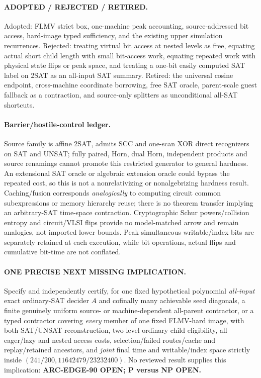 \documentclass[11pt]{article}
\begin{document}
\paragraph{ADOPTED / REJECTED / RETIRED.}
Adopted: FLMV strict box, one-machine peak accounting,
source-addressed bit access, hard-image typed sufficiency,
and the existing upper simulation recurrences.
Rejected: treating virtual bit access at nested levels as free,
equating actual short child length with small bit-access work,
equating repeated work with physical state flips or peak space,
and treating a one-bit easily computed SAT label on 2SAT as
an all-input SAT summary. Retired: the universal cosine endpoint,
cross-machine coordinate borrowing, free SAT oracle, parent-scale
guest fallback as a contraction, and source-only splitters as
unconditional all-SAT shortcuts.

\paragraph{Barrier/hostile-control ledger.}
Source family is affine 2SAT, admits SCC and one-scan XOR direct
recognizers on SAT and UNSAT; fully paired, Horn, dual Horn,
independent products and source renamings cannot promote this
restricted generator to general hardness.
An extensional SAT oracle or algebraic extension oracle could
bypass the repeated cost, so this is not a nonrelativizing
or nonalgebrizing hardness result.
Caching/fusion corresponds \emph{analogically} to computing
circuit common subexpressions or memory hierarchy reuse;
there is no theorem transfer implying an arbitrary-SAT
time-space contraction.
Cryptographic Schur powers/collision entropy and circuit/VLSI
flips provide no model-matched arrow and remain analogies, not
imported lower bounds.
Peak simultaneous writable/index bits are separately retained
at each execution, while bit operations, actual flips and
cumulative bit-time are not conflated.

\paragraph{ONE PRECISE NEXT MISSING IMPLICATION.}
Specify and independently certify, for one fixed hypothetical
polynomial \emph{all-input} exact ordinary-SAT decider \(A\) and
cofinally many achievable seed diagonals, a finite genuinely
uniform source- or machine-dependent all-parent contractor,
or a typed contractor covering \emph{every} member of one fixed
FLMV-hard image, with both SAT/UNSAT reconstruction, two-level
ordinary child eligibility, all eager/lazy and nested access
costs, selection/failed routes/cache and replay/retained ancestors,
and \emph{joint} final time and writable/index space strictly
inside \((241/200,11642479/23232400)\).
No reviewed result supplies this implication:
\textbf{ARC-EDGE-90 OPEN; P versus NP OPEN.}
\end{document}
